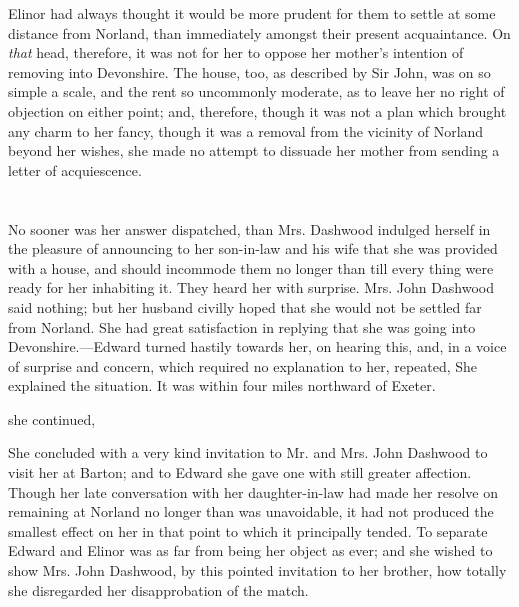 Elinor had always thought it would be more prudent for them to settle at some distance from Norland, than immediately amongst their present acquaintance. On {\em that} head, therefore, it was not for her to oppose her mother's intention of removing into Devonshire. The house, too, as described by Sir John, was on so simple a scale, and the rent so uncommonly moderate, as to leave her no right of objection on either point; and, therefore, though it was not a plan which brought any charm to her fancy, though it was a removal from the vicinity of Norland beyond her wishes, she made no attempt to dissuade her mother from sending a letter of acquiescence.

\chapter{} %

No sooner was her answer dispatched, than Mrs. Dashwood indulged herself in the pleasure of announcing to her son-in-law and his wife that she was provided with a house, and should incommode them no longer than till every thing were ready for her inhabiting it. They heard her with surprise. Mrs. John Dashwood said nothing; but her husband civilly hoped that she would not be settled far from Norland. She had great satisfaction in replying that she was going into Devonshire.---Edward turned hastily towards her, on hearing this, and, in a voice of surprise and concern, which required no explanation to her, repeated,  She explained the situation. It was within four miles northward of Exeter.

 she continued, 

She concluded with a very kind invitation to Mr. and Mrs. John Dashwood to visit her at Barton; and to Edward she gave one with still greater affection. Though her late conversation with her daughter-in-law had made her resolve on remaining at Norland no longer than was unavoidable, it had not produced the smallest effect on her in that point to which it principally tended. To separate Edward and Elinor was as far from being her object as ever; and she wished to show Mrs. John Dashwood, by this pointed invitation to her brother, how totally she disregarded her disapprobation of the match.

